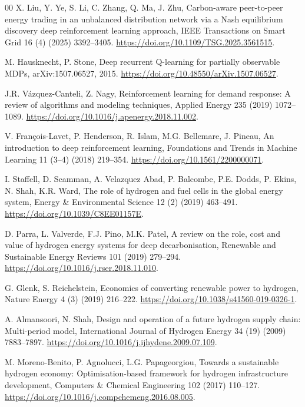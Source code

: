\documentclass[final,5p,times]{elsarticle}
\begin{document}
\begin{thebibliography}{00}
X. Liu, Y. Ye, S. Li, C. Zhang, Q. Ma, J. Zhu, Carbon-aware peer-to-peer energy trading in an unbalanced distribution network via a Nash equilibrium discovery deep reinforcement learning approach, IEEE Transactions on Smart Grid 16 (4) (2025) 3392--3405. \url{https://doi.org/10.1109/TSG.2025.3561515}.

M. Hausknecht, P. Stone, Deep recurrent Q-learning for partially observable MDPs, arXiv:1507.06527, 2015. \url{https://doi.org/10.48550/arXiv.1507.06527}.

J.R. V\'azquez-Canteli, Z. Nagy, Reinforcement learning for demand response: A review of algorithms and modeling techniques, Applied Energy 235 (2019) 1072--1089. \url{https://doi.org/10.1016/j.apenergy.2018.11.002}.

V. Fran\c{c}ois-Lavet, P. Henderson, R. Islam, M.G. Bellemare, J. Pineau, An introduction to deep reinforcement learning, Foundations and Trends in Machine Learning 11 (3--4) (2018) 219--354. \url{https://doi.org/10.1561/2200000071}.

I. Staffell, D. Scamman, A. Velazquez Abad, P. Balcombe, P.E. Dodds, P. Ekins, N. Shah, K.R. Ward, The role of hydrogen and fuel cells in the global energy system, Energy \& Environmental Science 12 (2) (2019) 463--491. \url{https://doi.org/10.1039/C8EE01157E}.

D. Parra, L. Valverde, F.J. Pino, M.K. Patel, A review on the role, cost and value of hydrogen energy systems for deep decarbonisation, Renewable and Sustainable Energy Reviews 101 (2019) 279--294. \url{https://doi.org/10.1016/j.rser.2018.11.010}.

G. Glenk, S. Reichelstein, Economics of converting renewable power to hydrogen, Nature Energy 4 (3) (2019) 216--222. \url{https://doi.org/10.1038/s41560-019-0326-1}.

A. Almansoori, N. Shah, Design and operation of a future hydrogen supply chain: Multi-period model, International Journal of Hydrogen Energy 34 (19) (2009) 7883--7897. \url{https://doi.org/10.1016/j.ijhydene.2009.07.109}.

M. Moreno-Benito, P. Agnolucci, L.G. Papageorgiou, Towards a sustainable hydrogen economy: Optimisation-based framework for hydrogen infrastructure development, Computers \& Chemical Engineering 102 (2017) 110--127. \url{https://doi.org/10.1016/j.compchemeng.2016.08.005}.


\end{thebibliography}
\end{document}

